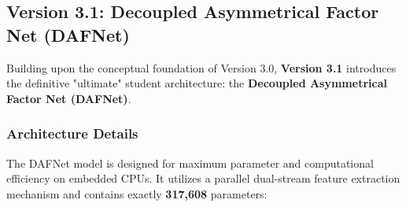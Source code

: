\documentclass[12pt,a4paper]{article}
\begin{document}
\subsection{Version 3.1: Decoupled Asymmetrical Factor Net (DAFNet)}
Building upon the conceptual foundation of Version 3.0, \textbf{Version 3.1} introduces the definitive "ultimate" student architecture: the \textbf{Decoupled Asymmetrical Factor Net (DAFNet)}.

\subsubsection{Architecture Details}
The DAFNet model is designed for maximum parameter and computational efficiency on embedded CPUs. It utilizes a parallel dual-stream feature extraction mechanism and contains exactly \textbf{317,608} parameters:
\end{document}
